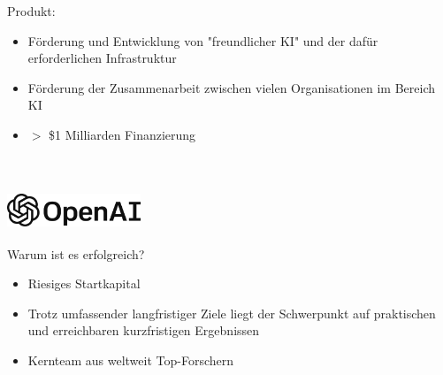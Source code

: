 \documentclass[handout]{beamer}
\begin{document}
\begin{frame}
    Produkt: \\
    \begin{itemize}
        \item<1-> Förderung und Entwicklung von "freundlicher KI" und der dafür erforderlichen Infrastruktur
        \item<2-> Förderung der Zusammenarbeit zwischen vielen Organisationen im Bereich KI
        \item<3-> $>$ \$1 Milliarden Finanzierung
    \end{itemize} ~\\
\end{frame}

\begin{frame}
    \frametitle{\includegraphics[width=0.3\textwidth]{openai.png}}
    Warum ist es erfolgreich? \\
    \begin{itemize}
        \item<1-> Riesiges Startkapital
        \item<2-> Trotz umfassender langfristiger Ziele liegt der Schwerpunkt auf praktischen und erreichbaren kurzfristigen Ergebnissen
        \item<3-> Kernteam aus weltweit Top-Forschern
    \end{itemize} ~\\
\end{frame}
\end{document}
